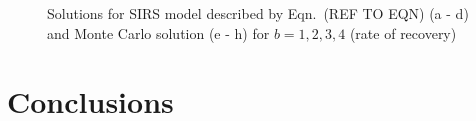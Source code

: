 \documentclass[10pt,showpacs,preprintnumbers,amsmath,amssymb,nofootinbib,aps,prl,twocolumn,groupedaddress,superscriptaddress,showkeys]{revtex4-1}
\begin{document}
\begin{figure}[h!tb]
  \caption{\label{fig:ODE_prob_a}Solutions for SIRS model described by Eqn.~(REF TO EQN) (a - d) and Monte Carlo solution (e - h) for $b=1, 2, 3, 4$ (rate of recovery)}
\end{figure}


\section{Conclusions}



\end{document}
